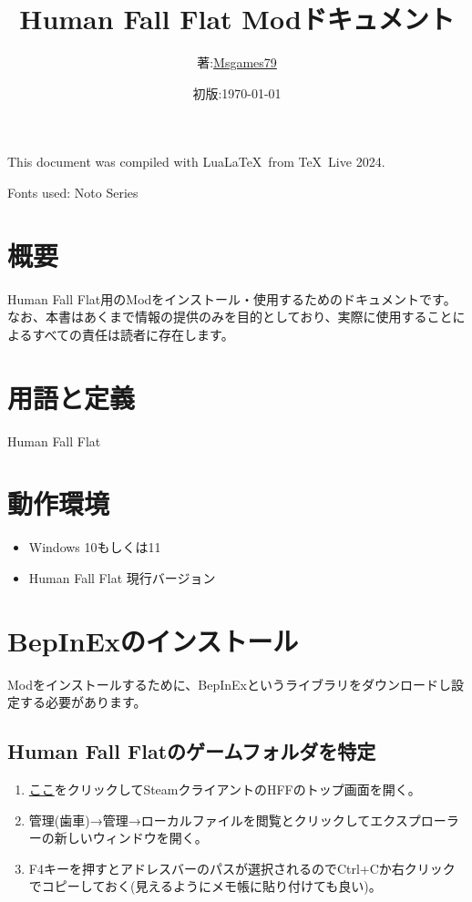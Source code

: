 \documentclass[lualatex,a4paper,fontsize=11pt,jafontscale=0.9247,titlepage,oneside]{jlreq}
\begin{document}
\title{Human Fall Flat Modドキュメント}
\author{著:\;\href{https://www.youtube.com/channel/UCKpnq5EXLCcuPsEGAjyXbsg}{Msgames79}}
\date{初版:\;\today}
\maketitle
This document was compiled with Lua\LaTeX\ from \TeX\ Live 2024.\par
Fonts used: Noto Series
\tableofcontents
\clearpage
\section{概要}
Human Fall Flat用のModをインストール・使用するためのドキュメントです。なお、本書はあくまで情報の提供のみを目的としており、実際に使用することによるすべての責任は読者に存在します。
\section{用語と定義}
\begin{description}
\item[Human Fall Flat]
\end{description}
\section{動作環境}
\begin{itemize}
\item Windows 10もしくは11
\item Human Fall Flat 現行バージョン
\end{itemize}
\section{BepInExのインストール}
Modをインストールするために、BepInExというライブラリをダウンロードし設定する必要があります。
\subsection{Human Fall Flatのゲームフォルダを特定}
\begin{enumerate}
\item \href{steam://open/games/details/477160}{ここ}をクリックしてSteamクライアントのHFFのトップ画面を開く。
\item \label{3.1.2}管理(歯車)→管理→ローカルファイルを閲覧とクリックしてエクスプローラーの新しいウィンドウを開く。
\item \label{3.1.3}F4キーを押すとアドレスバーのパスが選択されるのでCtrl+Cか右クリックでコピーしておく(見えるようにメモ帳に貼り付けても良い)。
\end{enumerate}
\end{document}
